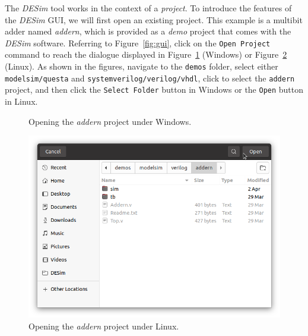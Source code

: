 The {\it DESim} tool works in the context of a {\it project}. To introduce the features of the 
{\it DESim} GUI, we will first open an existing project. This example is a multibit adder 
named {\it addern}, which is provided as a {\it demo} project that comes with the {\it DESim}
software. Referring to Figure~\ref{fig:gui}, click on the \texttt{Open Project} command 
to reach the dialogue displayed in Figure~\ref{fig:open_windows} (Windows) or 
Figure~\ref{fig:open_linux} (Linux). As shown in the figures, navigate
to the \texttt{demos} folder, select either \texttt{modelsim/questa} and 
\texttt{systemverilog/verilog/vhdl}, click to select the \texttt{addern} project, and then 
click the \texttt{Select Folder} button in Windows or the \texttt{Open} button in Linux.

\begin{figure}[h]
	\begin{center}
        \setlength{\fboxsep}{0pt}
	\end{center}
		  \caption{Opening the {\it addern} project under Windows.}
	\label{fig:open_windows}
\end{figure}

\begin{figure}[h]
	\begin{center}
        \setlength{\fboxsep}{0pt}
        \includegraphics[width = .75\textwidth]{figures/open_addern_linux.png}
	\end{center}
		  \caption{Opening the {\it addern} project under Linux.}
	\label{fig:open_linux}
\end{figure}

